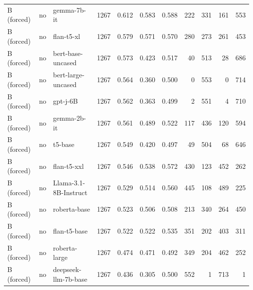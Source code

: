 \begin{landscape}
\begin{longtable}{lllc r r r r r r r}
\midrule
B (forced) & no  & gemma-7b-it           & 1267 & 0.612 & 0.583 & 0.588 & 222 & 331 & 161 & 553 \\
B (forced) & no  & flan-t5-xl            & 1267 & 0.579 & 0.571 & 0.570 & 280 & 273 & 261 & 453 \\
B (forced) & no  & bert-base-uncased     & 1267 & 0.573 & 0.423 & 0.517 &  40 & 513 &  28 & 686 \\
B (forced) & no  & bert-large-uncased    & 1267 & 0.564 & 0.360 & 0.500 &   0 & 553 &   0 & 714 \\
B (forced) & no  & gpt-j-6B              & 1267 & 0.562 & 0.363 & 0.499 &   2 & 551 &   4 & 710 \\
B (forced) & no  & gemma-2b-it           & 1267 & 0.561 & 0.489 & 0.522 & 117 & 436 & 120 & 594 \\
B (forced) & no  & t5-base               & 1267 & 0.549 & 0.420 & 0.497 &  49 & 504 &  68 & 646 \\
B (forced) & no  & flan-t5-xxl           & 1267 & 0.546 & 0.538 & 0.572 & 430 & 123 & 452 & 262 \\
B (forced) & no  & Llama-3.1-8B-Instruct & 1267 & 0.529 & 0.514 & 0.560 & 445 & 108 & 489 & 225 \\
B (forced) & no  & roberta-base          & 1267 & 0.523 & 0.506 & 0.508 & 213 & 340 & 264 & 450 \\
B (forced) & no  & flan-t5-base          & 1267 & 0.522 & 0.522 & 0.535 & 351 & 202 & 403 & 311 \\
B (forced) & no  & roberta-large         & 1267 & 0.474 & 0.471 & 0.492 & 349 & 204 & 462 & 252 \\
B (forced) & no  & deepseek-llm-7b-base  & 1267 & 0.436 & 0.305 & 0.500 & 552 &   1 & 713 &   1 \\


\end{longtable}
\end{landscape}
